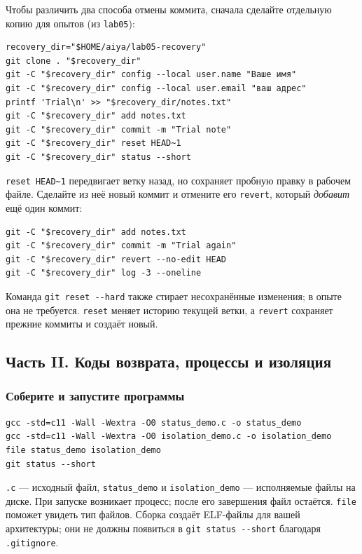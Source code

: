 Чтобы различить два способа отмены коммита, сначала сделайте отдельную
копию для опытов (из \texttt{lab05}):

\begin{verbatim}
recovery_dir="$HOME/aiya/lab05-recovery"
git clone . "$recovery_dir"
git -C "$recovery_dir" config --local user.name "Ваше имя"
git -C "$recovery_dir" config --local user.email "ваш адрес"
printf 'Trial\n' >> "$recovery_dir/notes.txt"
git -C "$recovery_dir" add notes.txt
git -C "$recovery_dir" commit -m "Trial note"
git -C "$recovery_dir" reset HEAD~1
git -C "$recovery_dir" status --short
\end{verbatim}

\texttt{reset HEAD\textasciitilde{}1} передвигает ветку назад, но
сохраняет пробную правку в рабочем файле. Сделайте из неё новый коммит
и отмените его \texttt{revert}, который \emph{добавит} ещё один коммит:

\begin{verbatim}
git -C "$recovery_dir" add notes.txt
git -C "$recovery_dir" commit -m "Trial again"
git -C "$recovery_dir" revert --no-edit HEAD
git -C "$recovery_dir" log -3 --oneline
\end{verbatim}

Команда \texttt{git reset -{}-hard} также стирает несохранённые изменения;
в опыте она не требуется. \texttt{reset} меняет историю текущей ветки,
а \texttt{revert} сохраняет прежние коммиты и создаёт новый.

\subsection{Часть II. Коды возврата, процессы и изоляция}

\subsubsection*{Соберите и запустите программы}

\begin{verbatim}
gcc -std=c11 -Wall -Wextra -O0 status_demo.c -o status_demo
gcc -std=c11 -Wall -Wextra -O0 isolation_demo.c -o isolation_demo
file status_demo isolation_demo
git status --short
\end{verbatim}

\texttt{.c} --- исходный файл, \texttt{status\_demo} и
\texttt{isolation\_demo} --- исполняемые файлы на диске. При запуске
возникает процесс; после его завершения файл остаётся. \texttt{file}
поможет увидеть тип файлов. Сборка создаёт ELF-файлы для вашей архитектуры;
они не должны появиться в \texttt{git status -{}-short} благодаря
\texttt{.gitignore}.

